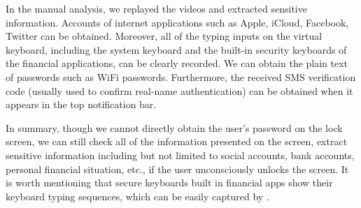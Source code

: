 In the manual analysis, we replayed the videos and extracted sensitive information.
Accounts of internet applications such as Apple, iCloud, Facebook, Twitter can be obtained.
Moreover, all of the typing inputs on the virtual keyboard, including the system keyboard and the built-in security keyboards of the financial applications, can be clearly recorded.
We can obtain the plain text of passwords such as WiFi passwords.
Furthermore, the received SMS verification code (usually used to confirm real-name authentication) can be obtained when it appears in the top notification bar.

In summary, though we cannot directly obtain the user's password on the lock screen, we can still check all of the information presented on the screen, extract sensitive information including but not limited to social accounts, bank accounts, personal financial situation, etc., if the user unconsciously unlocks the screen.
It is worth mentioning that {secure keyboards} built in financial apps show their keyboard typing sequences, which can be easily captured by \tool.
